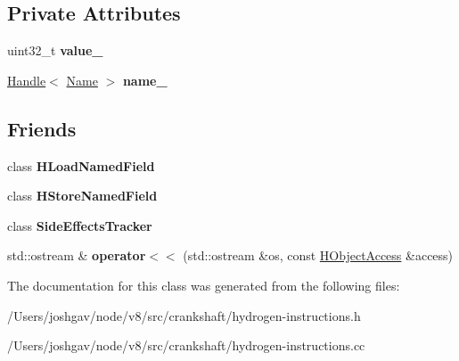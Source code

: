 \subsection*{Private Attributes}
\begin{DoxyCompactItemize}
\item 
uint32\+\_\+t {\bfseries value\+\_\+}\hypertarget{classv8_1_1internal_1_1_h_object_access_ac37e4728f8e4c2302c5e35296f6a7ca6}{}\label{classv8_1_1internal_1_1_h_object_access_ac37e4728f8e4c2302c5e35296f6a7ca6}

\item 
\hyperlink{classv8_1_1internal_1_1_handle}{Handle}$<$ \hyperlink{classv8_1_1internal_1_1_name}{Name} $>$ {\bfseries name\+\_\+}\hypertarget{classv8_1_1internal_1_1_h_object_access_a59ac7466ccfb4bd927f7ede276f60f03}{}\label{classv8_1_1internal_1_1_h_object_access_a59ac7466ccfb4bd927f7ede276f60f03}

\end{DoxyCompactItemize}
\subsection*{Friends}
\begin{DoxyCompactItemize}
\item 
class {\bfseries H\+Load\+Named\+Field}\hypertarget{classv8_1_1internal_1_1_h_object_access_a51e0d0e57bb57f80b32e326dfc27dac4}{}\label{classv8_1_1internal_1_1_h_object_access_a51e0d0e57bb57f80b32e326dfc27dac4}

\item 
class {\bfseries H\+Store\+Named\+Field}\hypertarget{classv8_1_1internal_1_1_h_object_access_ad3565a7547650e795b6e7028ea7437a1}{}\label{classv8_1_1internal_1_1_h_object_access_ad3565a7547650e795b6e7028ea7437a1}

\item 
class {\bfseries Side\+Effects\+Tracker}\hypertarget{classv8_1_1internal_1_1_h_object_access_a79af41808690c90c6bc5a0ea5445945f}{}\label{classv8_1_1internal_1_1_h_object_access_a79af41808690c90c6bc5a0ea5445945f}

\item 
std\+::ostream \& {\bfseries operator$<$$<$} (std\+::ostream \&os, const \hyperlink{classv8_1_1internal_1_1_h_object_access}{H\+Object\+Access} \&access)\hypertarget{classv8_1_1internal_1_1_h_object_access_a6464c680ded5ca6b5c7912bbdbf89fcf}{}\label{classv8_1_1internal_1_1_h_object_access_a6464c680ded5ca6b5c7912bbdbf89fcf}

\end{DoxyCompactItemize}


The documentation for this class was generated from the following files\+:\begin{DoxyCompactItemize}
\item 
/\+Users/joshgav/node/v8/src/crankshaft/hydrogen-\/instructions.\+h\item 
/\+Users/joshgav/node/v8/src/crankshaft/hydrogen-\/instructions.\+cc\end{DoxyCompactItemize}
